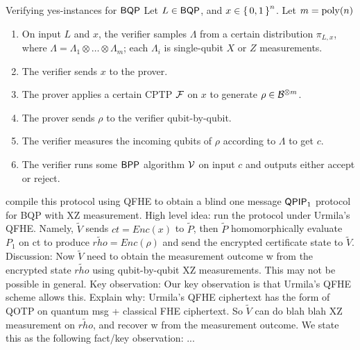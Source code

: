 \begin{protocol}{Verifying yes-instances for $\operatorname{\mathsf{BQP}}$}
	\label{proto:BQP}
	Let $L\in\operatorname{\mathsf{BQP}}$, and $x\in\set{0,1}^n$. Let $m=\operatorname*{\operatorname{poly}}(n)$
	\begin{enumerate}
		\item On input $L$ and $x$, the verifier samples $\Lambda$ from a certain distribution $\pi_{L, x}$, where $\Lambda=\Lambda_1\otimes\ldots\otimes\Lambda_m$; each $\Lambda_i$ is single-qubit $X$ or $Z$ measurements.
		\item The verifier sends $x$ to the prover.
		\item The prover applies a certain CPTP $\mathcal{F}$ on $x$ to generate $\rho\in\mathcal{B}^{\otimes m}$.
		\item The prover sends $\rho$ to the verifier qubit-by-qubit.
		\item The verifier measures the incoming qubits of $\rho$ according to $\Lambda$ to get $c$.
		\item The verifier runs some $\operatorname{\mathsf{BPP}}$ algorithm $\mathcal{V}$ on input $c$ and outputs either accept or reject.
	\end{enumerate}
\end{protocol}


compile this protocol using QFHE to obtain a blind one message $\operatorname{\mathsf{QPIP}}_1$ protocol for BQP with XZ measurement.
High level idea:  run the protocol under Urmila’s QFHE. Namely, $\tilde{V}$ sends $ct = Enc(x)$ to $\tilde{P}$, then $\tilde{P}$ homomorphically evaluate $P_1$ on ct to produce $\tilde{rho} = Enc(\rho)$ and send the encrypted certificate state to $\tilde{V}$.
Discussion: Now $\tilde{V}$ need to obtain the measurement outcome w from the encrypted state $\tilde{rho}$ using qubit-by-qubit XZ measurements. This may not be possible in general. 
Key observation: Our key observation is that Urmila’s QFHE scheme allows this. 
Explain why: Urmila’s QFHE ciphertext has the form of  QOTP on quantum msg + classical FHE ciphertext. So $\tilde{V}$ can do blah blah XZ measurement on $\tilde{rho}$, and recover w from the measurement outcome. We state this as the following fact/key observation: ...


